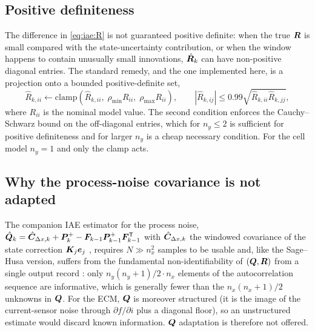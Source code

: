\subsection{Positive definiteness}
The difference in \eqref{eq:iae:R} is not guaranteed positive definite: when the true $\bm{R}$ is small
compared with the state-uncertainty contribution, or when the window happens to contain unusually
small innovations, $\hat{\bm{R}}_k$ can have non-positive diagonal entries.  The standard remedy, and
the one implemented here, is a projection onto a bounded positive-definite set,
\begin{equation}
\hat R_{k,ii} \gets \mathrm{clamp}\!\left(\hat R_{k,ii},\; \rho_{\min} R_{ii},\; \rho_{\max} R_{ii}\right),
\qquad
|\hat R_{k,ij}| \le 0.99\sqrt{\hat R_{k,ii}\hat R_{k,jj}},
\label{eq:iae:floor}
\end{equation}
where $R_{ii}$ is the nominal model value.  The second condition enforces the Cauchy--Schwarz bound
on the off-diagonal entries, which for $n_y\le 2$ is sufficient for positive definiteness and for
larger $n_y$ is a cheap necessary condition.  For the cell model $n_y=1$ and only the clamp acts.

\subsection{Why the process-noise covariance is not adapted}
The companion IAE estimator for the process noise,
$\hat{\bm{Q}}_k = \hat{\bm{C}}_{\Delta x,k} + \bm{P}^{+}_k - \bm{F}_{k-1}\bm{P}^{+}_{k-1}\bm{F}_{k-1}^{\mathsf{T}}$ with
$\hat{\bm{C}}_{\Delta x,k}$ the windowed covariance of the state correction $\bm{K}_j\bm{e}_j$
\cite[Eq.~(17)]{mohamed1999adaptive}, requires $N \gg n_x^2$ samples to be usable and, like the
Sage--Husa version, suffers from the fundamental non-identifiability of $(\bm{Q},\bm{R})$ from a single
output record \cite{mehra1970}: only $n_y(n_y+1)/2 \cdot n_x$ elements of the autocorrelation
sequence are informative, which is generally fewer than the $n_x(n_x+1)/2$ unknowns in $\bm{Q}$.  For
the ECM, $\bm{Q}$ is moreover structured (it is the image of the current-sensor noise through
$\partial f/\partial i$ plus a diagonal floor), so an unstructured estimate would discard known
information.  $\bm{Q}$ adaptation is therefore not offered.

